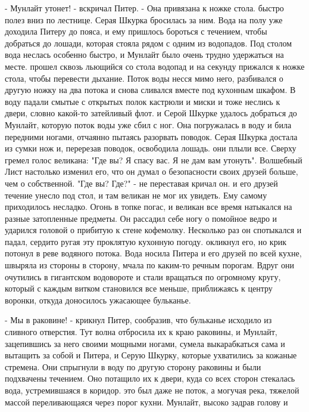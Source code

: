 \par- Мунлайт утонет! - вскричал Питер. - Она привязана к ножке стола.
 быстро полез вниз по лестнице. Серая Шкурка бросилась за ним. 
Вода на полу уже доходила Питеру до пояса, и ему пришлось бороться с 
течением, чтобы добраться до лошади, которая стояла рядом с одним из 
водопадов. Под столом вода неслась особенно быстро, и Мунлайт было 
очень трудно удержаться на месте.
 прошел сквозь льющийся со стола водопад и на секунду 
прижался к ножке стола, чтобы перевести дыхание. Поток воды несся мимо 
него, разбивался о другую ножку на два потока и снова сливался вместе 
под кухонным шкафом. В воду падали смытые с открытых полок кастрюли и 
миски и тоже неслись к двери, словно какой-то затейливый флот.
 и Серой Шкурке удалось добраться до Мунлайт, которую поток 
воды уже сбил с ног. Она погружалась в воду и била передними ногами, 
отчаянно пытаясь разорвать поводок. Серая Шкурка достала из сумки нож 
и, перерезав поводок, освободила лошадь.
 они плыли все. Сверху гремел голос великана: "Где вы? Я 
спасу вас. Я не дам вам утонуть". Волшебный Лист настолько изменил 
его, что он думал о безопасности своих друзей больше, чем о 
собственной. "Где вы? Где?" - не переставая кричал он.
 и его друзей течение унесло под стол, и там великан не мог 
их увидеть. Ему самому приходилось несладко. Огонь в топке погас, и 
великан все время натыкался на разные затопленные предметы. Он 
рассадил себе ногу о помойное ведро и ударился головой о прибитую к 
стене кофемолку. Несколько раз он спотыкался и падал, сердито ругая 
эту проклятую кухонную погоду.
 окликнул его, но крик потонул в реве водяного потока. Вода 
носила Питера и его друзей по всей кухне, швыряла из стороны в 
сторону, мчала по каким-то речным порогам. Вдруг они очутились в 
гигантском водовороте и стали вращаться по огромному кругу, который с 
каждым витком становился все меньше, приближаясь к центру воронки, 
откуда доносилось ужасающее бульканье.
\par- Мы в раковине! - крикнул Питер, сообразив, что бульканье 
исходило из сливного отверстия. Тут волна отбросила их к краю 
раковины, и Мунлайт, зацепившись за него своими мощными ногами, сумела 
выкарабкаться сама и вытащить за собой и Питера, и Серую Шкурку, 
которые ухватились за кожаные стремена. Они спрыгнули в воду по другую 
сторону раковины и были подхвачены течением. Оно потащило их к двери, 
куда со всех сторон стекалась вода, устремившаяся в коридор.
 это был даже не поток, а могучая река, тяжелой массой 
переливающаяся через порог кухни. Мунлайт, высоко задрав голову и 
